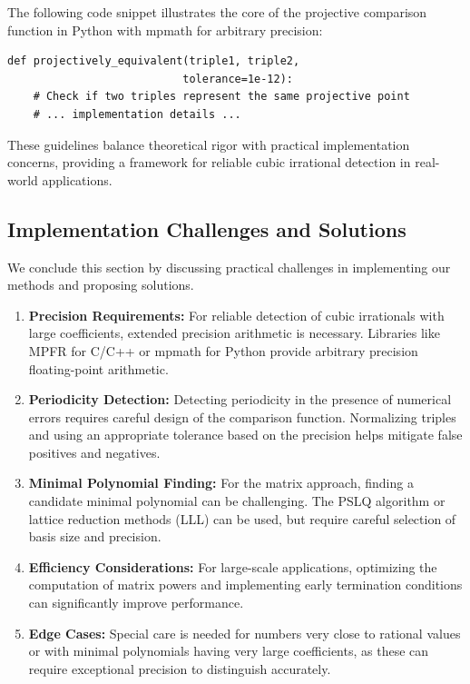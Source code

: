 The following code snippet illustrates the core of the projective comparison function in Python with mpmath for arbitrary precision:

\begin{verbatim}
def projectively_equivalent(triple1, triple2, 
                           tolerance=1e-12):
    # Check if two triples represent the same projective point
    # ... implementation details ...
\end{verbatim}

These guidelines balance theoretical rigor with practical implementation concerns, providing a framework for reliable cubic irrational detection in real-world applications.

\subsection{Implementation Challenges and Solutions}

We conclude this section by discussing practical challenges in implementing our methods and proposing solutions.

\begin{enumerate}
    \item \textbf{Precision Requirements:} For reliable detection of cubic irrationals with large coefficients, extended precision arithmetic is necessary. Libraries like MPFR for C/C++ or mpmath for Python provide arbitrary precision floating-point arithmetic.
    
    \item \textbf{Periodicity Detection:} Detecting periodicity in the presence of numerical errors requires careful design of the comparison function. Normalizing triples and using an appropriate tolerance based on the precision helps mitigate false positives and negatives.
    
    \item \textbf{Minimal Polynomial Finding:} For the matrix approach, finding a candidate minimal polynomial can be challenging. The PSLQ algorithm or lattice reduction methods (LLL) can be used, but require careful selection of basis size and precision.
    
    \item \textbf{Efficiency Considerations:} For large-scale applications, optimizing the computation of matrix powers and implementing early termination conditions can significantly improve performance.
    
    \item \textbf{Edge Cases:} Special care is needed for numbers very close to rational values or with minimal polynomials having very large coefficients, as these can require exceptional precision to distinguish accurately.
\end{enumerate}

